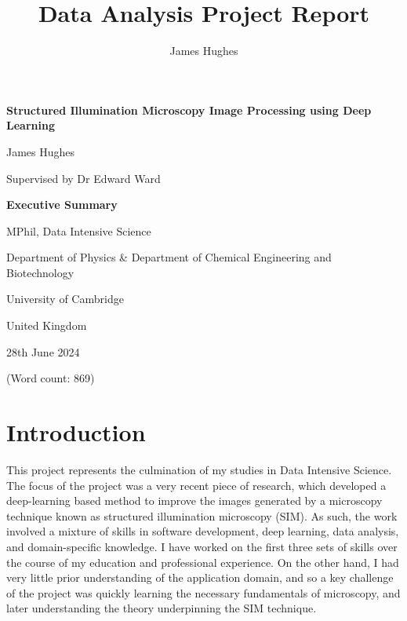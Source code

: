 \documentclass[12pt]{article}
\title{Data Analysis Project Report}
\author{James Hughes}
\begin{document}
\begin{titlepage}
    \begin{center}
        \vspace*{1cm}

        \Huge
        \textbf{Structured Illumination Microscopy Image Processing using Deep Learning}

        \vspace{0.5cm}
        \LARGE

        James Hughes

        Supervised by Dr Edward Ward

        \vspace{2cm}
        \Huge
        \textbf{Executive Summary}

        \vfill

        MPhil, Data Intensive Science

        \vspace{0.8cm}

        \Large
        Department of Physics \& Department of Chemical Engineering and Biotechnology

        University of Cambridge

        United Kingdom

        28th June 2024

        (Word count: 869)

    \end{center}
\end{titlepage}

\newpage

\newpage
\section*{Introduction}

This project represents the culmination of my studies in Data Intensive Science.
The focus of the project was a very recent piece of research,
which developed a deep-learning based method to improve the images generated by a microscopy technique known as structured illumination microscopy (SIM).
As such, the work involved a mixture of skills in software development, deep learning, data analysis, and domain-specific knowledge.
I have worked on the first three sets of skills over the course of my education and professional experience.
On the other hand, I had very little prior understanding of the application domain,
and so a key challenge of the project was quickly learning the necessary fundamentals of microscopy,
and later understanding the theory underpinning the SIM technique.
\end{document}
